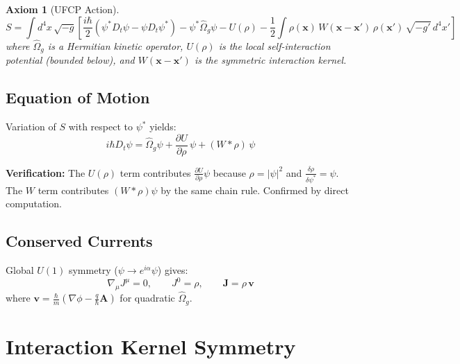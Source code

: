 \documentclass[11pt, a4paper]{article}
\newtheorem{axiom}{Axiom}[section]
\begin{document}
\begin{axiom}[UFCP Action]
\begin{equation}
  \boxed{
  S = \int d^4x\, \sqrt{-g} \left[
    \frac{i\hbar}{2}\!\left(\psi^* D_t\psi - \psi D_t\psi^*\right)
    - \psi^* \hat{\Omega}_g \psi
    - U(\rho)
    - \frac{1}{2}\int \rho(\mathbf{x})\, W(\mathbf{x}-\mathbf{x}')\,
      \rho(\mathbf{x}')\, \sqrt{-g'}\, d^4x'
  \right]
  }
  \label{eq:action}
\end{equation}
where $\hat{\Omega}_g$ is a Hermitian kinetic operator, $U(\rho)$ is the
local self-interaction potential (bounded below), and
$W(\mathbf{x}-\mathbf{x}')$ is the symmetric interaction kernel.
\end{axiom}

\subsection{Equation of Motion}

Variation of $S$ with respect to $\psi^*$ yields:
\begin{equation}
  \boxed{
  i\hbar D_t \psi = \hat{\Omega}_g \psi
    + \frac{\partial U}{\partial \rho}\,\psi
    + (W * \rho)\,\psi
  }
  \label{eq:eom}
\end{equation}

\textbf{Verification:} The $U(\rho)$ term contributes
$\frac{\partial U}{\partial \rho}\psi$ because $\rho = |\psi|^2$ and
$\frac{\delta \rho}{\delta \psi^*} = \psi$. The $W$ term contributes
$(W * \rho)\psi$ by the same chain rule. Confirmed by direct computation.

\subsection{Conserved Currents}

Global $U(1)$ symmetry ($\psi \to e^{i\alpha}\psi$) gives:
\begin{equation}
  \nabla_\mu J^\mu = 0, \qquad
  J^0 = \rho, \qquad
  \mathbf{J} = \rho\, \mathbf{v}
  \label{eq:current}
\end{equation}
where $\mathbf{v} = \frac{\hbar}{m}\!\left(\nabla\phi
- \frac{q}{\hbar}\mathbf{A}\right)$ for quadratic $\hat{\Omega}_g$.

\section{Interaction Kernel Symmetry}
\end{document}

